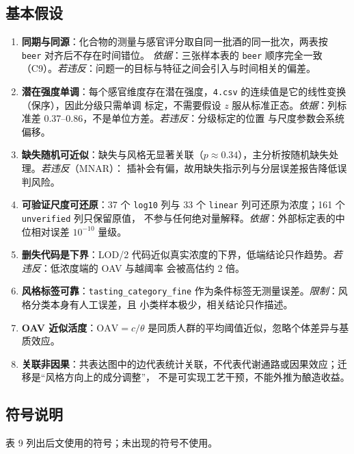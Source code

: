 \documentclass[
  a4paper,12pt]{article}
\providecommand{\tightlist}{%
  \setlength{\itemsep}{0pt}\setlength{\parskip}{0pt}}
\begin{document}
\subsection{基本假设}\label{ux57faux672cux5047ux8bbe}

\begin{enumerate}
\def\labelenumi{\arabic{enumi}.}
\tightlist
\item
  \textbf{同期与同源}：化合物的测量与感官评分取自同一批酒的同一批次，两表按
  \texttt{beer} 对齐后不存在时间错位。 \emph{依据}：三张样本表的
  \texttt{beer}
  顺序完全一致（C9）。\emph{若违反}：问题一的目标与特征之间会引入与时间相关的偏差。
\item
  \textbf{潜在强度单调}：每个感官维度存在潜在强度，\texttt{4.csv}
  的连续值是它的线性变换（保序），因此分级只需单调 标定，不需要假设
  \(z\) 服从标准正态。\emph{依据}：列标准差
  0.37--0.86，不是单位方差。\emph{若违反}：分级标定的位置
  与尺度参数会系统偏移。
\item
  \textbf{缺失随机可近似}：缺失与风格无显著关联（\(p\approx0.34\)），主分析按随机缺失处理。\emph{若违反}（MNAR）：
  插补会有偏，故用缺失指示列与分层误差报告降低误判风险。
\item
  \textbf{可验证尺度可还原}：37 个 \texttt{log10} 列与 33 个
  \texttt{linear} 列可还原为浓度；161 个 \texttt{unverified}
  列只保留原值，
  不参与任何绝对量解释。\emph{依据}：外部标定表的中位相对误差
  \(10^{-10}\) 量级。
\item
  \textbf{删失代码是下界}：LOD/2
  代码近似真实浓度的下界，低端结论只作趋势。\emph{若违反}：低浓度端的
  OAV 与越阈率 会被高估约 2 倍。
\item
  \textbf{风格标签可靠}：\texttt{tasting\_category\_fine}
  作为条件标签无测量误差。\emph{限制}：风格分类本身有人工误差，且
  小类样本极少，相关结论只作描述。
\item
  \textbf{OAV 近似活度}：\(\mathrm{OAV}=c/\theta\)
  是同质人群的平均阈值近似，忽略个体差异与基质效应。
\item
  \textbf{关联非因果}：共表达图中的边代表统计关联，不代表代谢通路或因果效应；迁移是``风格方向上的成分调整''，
  不是可实现工艺干预，不能外推为酿造收益。
\end{enumerate}

\subsection{符号说明}\label{ux7b26ux53f7ux8bf4ux660e}

表 9 列出后文使用的符号；未出现的符号不使用。
\end{document}
